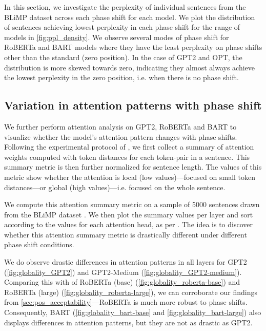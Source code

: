 \documentclass[letterpaper, 12pt]{report}
\begin{document}
In this section, we investigate the perplexity of individual sentences from the BLiMP dataset across each phase shift for each model. We plot the distribution of sentences achieving lowest perplexity in each phase shift for the range of models in \autoref{fig:ppl_density}. We observe several modes of phase shift for RoBERTa and BART models where they have the least perplexity on phase shifts other than the standard (zero position). In the case of GPT2 and OPT, the distribution is more skewed towards zero, indicating they almost always achieve the lowest perplexity in the zero position, i.e. when there is no phase shift.

\subsection{Variation in attention patterns with phase shift}
\label{sec:pos_attention_analysis}


We further perform attention analysis on GPT2, RoBERTa and BART to visualize whether the model's attention pattern changes with phase shifts. Following the experimental protocol of \citet{raghu2021vision}, we first collect a summary of attention weights computed with token distances for each token-pair in a sentence. This summary metric is then further normalized for sentence length. The values of this metric show whether the attention is local (low values)---focused on small token distances---or global (high values)---i.e. focused on the whole sentence.

We compute this attention summary metric on a sample of 5000 sentences drawn from the BLiMP dataset \cite{warstadt-etal-2020-BLiMP-benchmark}. We then plot the summary values per layer and sort according to the values for each attention head, as per \citet{raghu2021vision}. The idea is to discover whether this attention summary metric is drastically different under different phase shift conditions. %

We do observe drastic differences in attention patterns in all layers for GPT2 (\autoref{fig:globality_GPT2}) and GPT2-Medium (\autoref{fig:globality_GPT2-medium}). Comparing this with of RoBERTa (base) (\autoref{fig:globality_roberta-base}) and RoBERTa (large) (\autoref{fig:globality_roberta-large}), we can corroborate our findings from \autoref{sec:pos_acceptability}---RoBERTa is much more robust to phase shifts. Consequently, BART (\autoref{fig:globality_bart-base} and \autoref{fig:globality_bart-large}) also displays differences in attention patterns, but they are not as drastic as GPT2.
\end{document}
